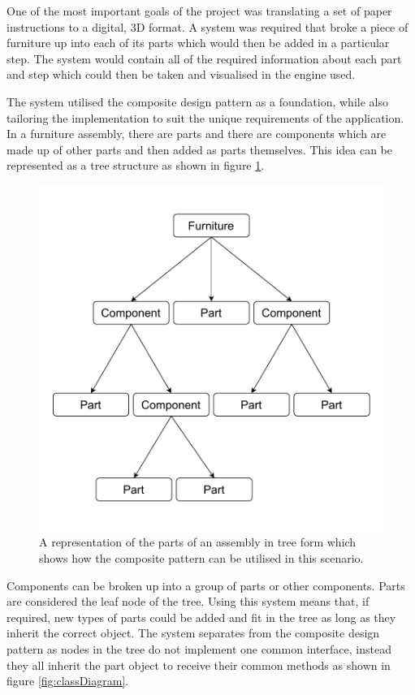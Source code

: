 \documentclass{l4proj}
\begin{document}
One of the most important goals of the project was translating a set of paper instructions to a digital, 3D format. A system was required that broke a piece of furniture up into each of its parts which would then be added in a particular step. The system would contain all of the required information about each part and step which could then be taken and visualised in the engine used.

The system utilised the composite design pattern \citep{riehle_composite_1997} as a foundation, while also tailoring the implementation to suit the unique requirements of the application. In a furniture assembly, there are parts and there are components which are made up of other parts and then added as parts themselves. This idea can be represented as a tree structure as shown in figure \ref{fig:compPattern}. 

\begin{figure}[hbt!]
    \centering
    \includegraphics[width=0.5\linewidth]{dissertation//images/compositePattern.pdf}
    \caption{A representation of the parts of an assembly in tree form which shows how the composite pattern can be utilised in this scenario.}
    \label{fig:compPattern}
\end{figure}

Components can be broken up into a group of parts or other components. Parts are considered the leaf node of the tree. Using this system means that, if required, new types of parts could be added and fit in the tree as long as they inherit the correct object. The system separates from the composite design pattern as nodes in the tree do not implement one common interface, instead they all inherit the part object to receive their common methods as shown in figure \ref{fig:classDiagram}.
\end{document}
